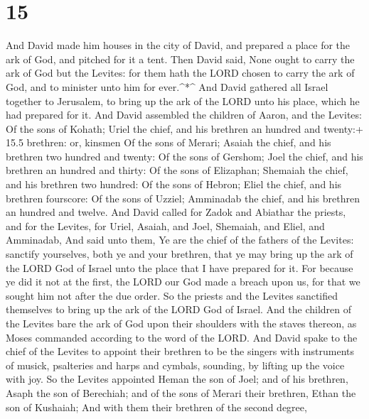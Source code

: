 \hypertarget{section-14}{%
\section{15}\label{section-14}}

 And David made him houses in the city of David, and
prepared a place for the ark of God, and pitched for it a tent.
 Then David said, None ought to carry the ark of God but the
Levites: for them hath the LORD chosen to carry the ark of God, and to
minister unto him for ever.\^{}*\^{}  And David gathered all
Israel together to Jerusalem, to bring up the ark of the LORD unto his
place, which he had prepared for it.  And David assembled
the children of Aaron, and the Levites:  Of the sons of
Kohath; Uriel the chief, and his brethren an hundred and twenty:+ 15.5
brethren: or, kinsmen  Of the sons of Merari; Asaiah the
chief, and his brethren two hundred and twenty:  Of the sons
of Gershom; Joel the chief, and his brethren an hundred and thirty:
 Of the sons of Elizaphan; Shemaiah the chief, and his
brethren two hundred:  Of the sons of Hebron; Eliel the
chief, and his brethren fourscore:  Of the sons of Uzziel;
Amminadab the chief, and his brethren an hundred and twelve.
 And David called for Zadok and Abiathar the priests, and
for the Levites, for Uriel, Asaiah, and Joel, Shemaiah, and Eliel, and
Amminadab,  And said unto them, Ye are the chief of the
fathers of the Levites: sanctify yourselves, both ye and your brethren,
that ye may bring up the ark of the LORD God of Israel unto the place
that I have prepared for it.  For because ye did it not at
the first, the LORD our God made a breach upon us, for that we sought
him not after the due order.  So the priests and the
Levites sanctified themselves to bring up the ark of the LORD God of
Israel.  And the children of the Levites bare the ark of
God upon their shoulders with the staves thereon, as Moses commanded
according to the word of the LORD.  And David spake to the
chief of the Levites to appoint their brethren to be the singers with
instruments of musick, psalteries and harps and cymbals, sounding, by
lifting up the voice with joy.  So the Levites appointed
Heman the son of Joel; and of his brethren, Asaph the son of Berechiah;
and of the sons of Merari their brethren, Ethan the son of Kushaiah;
 And with them their brethren of the second degree,
